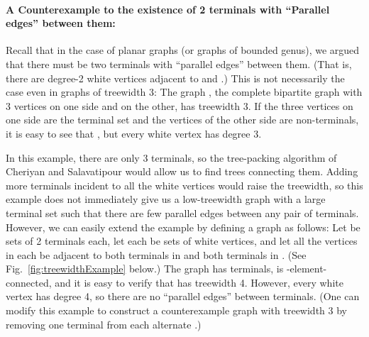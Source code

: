 \documentclass[11pt]{article}
\begin{document}
\medskip
\paragraph{A Counterexample to the existence of 2 terminals with 
  ``Parallel edges'' between them:}

Recall that in the case of planar graphs (or graphs of bounded genus),
we argued that there must be two terminals  with 
``parallel edges'' between them. (That is, there are 
degree-2 white vertices adjacent to  and .)  This is not
necessarily the case even in graphs of treewidth 3:
The graph , the complete bipartite graph with 3 vertices on
one side and  on the other, has treewidth 3. If the three vertices
on one side are the terminal set  and the  vertices of the other
side are non-terminals, it is easy to see that , but
every white vertex has degree 3.

In this example, there are only 3 terminals, so the tree-packing
algorithm of Cheriyan and Salavatipour \cite{cs} would allow us to
find  trees connecting them. Adding
more terminals incident to all the white vertices would raise the
treewidth, so this example does not immediately give us a
low-treewidth graph with a large terminal set such that there are few
parallel edges between any pair of terminals. However, we can easily
extend the example by defining a graph  as follows: Let  be sets of 2 terminals each, let  each be sets of  white vertices, and let all the vertices
in each  be adjacent to both terminals in  and both
terminals in . (See Fig.~\ref{fig:treewidthExample} below.)
The graph  has  terminals,  is
-element-connected, and it is easy to verify that  has
treewidth 4. However, every white vertex has degree 4, so there are no
``parallel edges'' between terminals. (One can modify this example to
construct a counterexample graph  with treewidth 3 by removing one
terminal from each alternate .)
\end{document}

